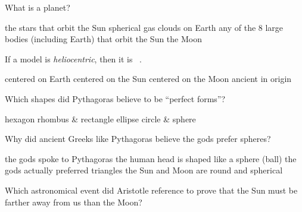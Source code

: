 \documentclass[addpoints]{exam}
\begin{document}
\begin{questions}
\question
What is a planet?

\begin{choices}
\choice the stars that orbit the Sun
\choice spherical gas clouds on Earth
\correctchoice any of the 8 large bodies (including Earth) that orbit the Sun
\choice the Moon
\end{choices}




\question
If a model is \textit{heliocentric}, then it is \fillin\ .

\begin{choices}
\choice centered on Earth
\correctchoice centered on the Sun
\choice centered on the Moon
\choice ancient in origin
\end{choices}

\clearpage

\question
Which shapes did Pythagoras believe to be ``perfect forms''?

\begin{choices}
    \choice hexagon
    \choice rhombus \& rectangle
    \choice ellipse
    \correctchoice circle \& sphere
\end{choices}

\question
Why did ancient Greeks like Pythagoras believe the gods prefer spheres?

\begin{choices}
    \choice the gods spoke to Pythagoras
    \choice the human head is shaped like a sphere (ball)
    \choice the gods actually preferred triangles
    \correctchoice the Sun and Moon are round and spherical
\end{choices}

\question
Which astronomical event did Aristotle reference to prove that the Sun must be farther away from us than the Moon?


\end{questions}
\end{document}
